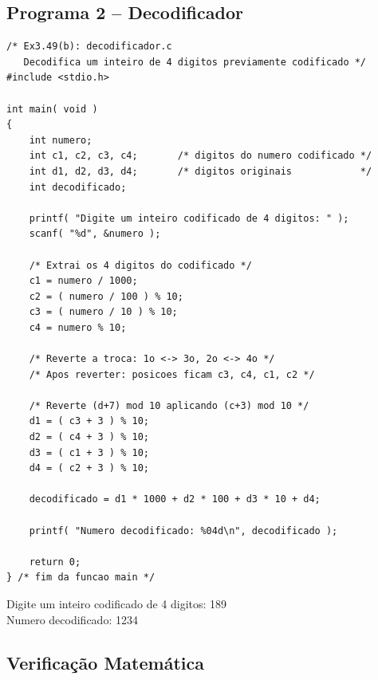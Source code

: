 \documentclass[12pt,a4paper]{article}
\begin{document}
\subsection*{Programa 2 -- Decodificador}

\begin{respostabox}
\begin{lstlisting}
/* Ex3.49(b): decodificador.c
   Decodifica um inteiro de 4 digitos previamente codificado */
#include <stdio.h>

int main( void )
{
    int numero;
    int c1, c2, c3, c4;       /* digitos do numero codificado */
    int d1, d2, d3, d4;       /* digitos originais            */
    int decodificado;

    printf( "Digite um inteiro codificado de 4 digitos: " );
    scanf( "%d", &numero );

    /* Extrai os 4 digitos do codificado */
    c1 = numero / 1000;
    c2 = ( numero / 100 ) % 10;
    c3 = ( numero / 10 ) % 10;
    c4 = numero % 10;

    /* Reverte a troca: 1o <-> 3o, 2o <-> 4o */
    /* Apos reverter: posicoes ficam c3, c4, c1, c2 */

    /* Reverte (d+7) mod 10 aplicando (c+3) mod 10 */
    d1 = ( c3 + 3 ) % 10;
    d2 = ( c4 + 3 ) % 10;
    d3 = ( c1 + 3 ) % 10;
    d4 = ( c2 + 3 ) % 10;

    decodificado = d1 * 1000 + d2 * 100 + d3 * 10 + d4;

    printf( "Numero decodificado: %04d\n", decodificado );

    return 0;
} /* fim da funcao main */
\end{lstlisting}

\begin{saida}
Digite um inteiro codificado de 4 digitos: 189\\
Numero decodificado: 1234
\end{saida}
\end{respostabox}

\subsection*{Verificação Matemática}
\end{document}

